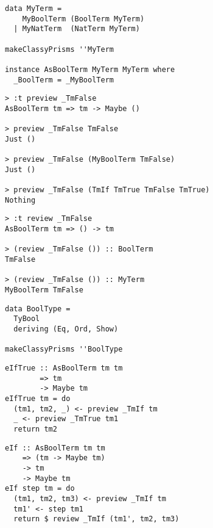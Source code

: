 \documentclass[aspectration=169]{beamer}
\begin{document}
\begin{frame}[fragile]
  \begin{verbatim}
data MyTerm =
    MyBoolTerm (BoolTerm MyTerm)
  | MyNatTerm  (NatTerm MyTerm)

makeClassyPrisms ''MyTerm

instance AsBoolTerm MyTerm MyTerm where
  _BoolTerm = _MyBoolTerm
  \end{verbatim}
\end{frame} 

\begin{frame}[fragile]
  \begin{verbatim}
> :t preview _TmFalse
AsBoolTerm tm => tm -> Maybe ()

> preview _TmFalse TmFalse
Just ()

> preview _TmFalse (MyBoolTerm TmFalse)
Just ()

> preview _TmFalse (TmIf TmTrue TmFalse TmTrue)
Nothing
  \end{verbatim}
\end{frame} 

\begin{frame}[fragile]
  \begin{verbatim}
> :t review _TmFalse
AsBoolTerm tm => () -> tm

> (review _TmFalse ()) :: BoolTerm
TmFalse

> (review _TmFalse ()) :: MyTerm
MyBoolTerm TmFalse
  \end{verbatim}
\end{frame} 

\begin{frame}[fragile]
  \begin{verbatim}
data BoolType =
  TyBool
  deriving (Eq, Ord, Show)

makeClassyPrisms ''BoolType
  \end{verbatim}
\end{frame} 

\begin{frame}[fragile]
  \begin{verbatim}
eIfTrue :: AsBoolTerm tm tm
        => tm
        -> Maybe tm
eIfTrue tm = do
  (tm1, tm2, _) <- preview _TmIf tm
  _ <- preview _TmTrue tm1
  return tm2
  \end{verbatim}
\end{frame} 

\begin{frame}[fragile]
  \begin{verbatim}
eIf :: AsBoolTerm tm tm
    => (tm -> Maybe tm)
    -> tm
    -> Maybe tm
eIf step tm = do
  (tm1, tm2, tm3) <- preview _TmIf tm
  tm1' <- step tm1
  return $ review _TmIf (tm1', tm2, tm3)
  \end{verbatim}
\end{frame} 
\end{document}
